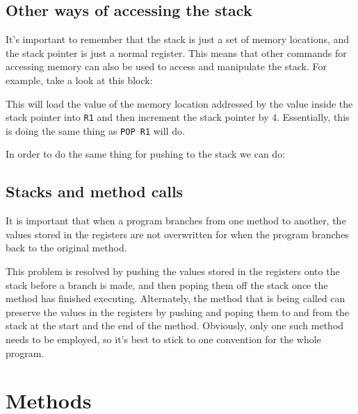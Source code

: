 \subsection{Other ways of accessing the stack}

It's important to remember that the stack is just a set of memory locations, and
the stack pointer is just a normal register. This means that other commands for
accessing memory can also be used to access and manipulate the stack. For
example, take a look at this block:



This will load the value of the memory location addressed by the value inside
the stack pointer into {\tt R1} and then increment the stack pointer by 4.
Essentially, this is doing the same thing as {\tt POP R1} will do.

In order to do the same thing for pushing to the stack we can do:



\subsection{Stacks and method calls}

It is important that when a program branches from one method to another, the
values stored in the registers are not overwritten for when the program branches
back to the original method.

This problem is resolved by pushing the values stored in the registers onto the
stack before a branch is made, and then poping them off the stack once the
method has finished executing. Alternately, the method that is being called can
preserve the values in the registers by pushing and poping them to and from the
stack at the start and the end of the method. Obviously, only one such method
needs to be employed, so it's best to stick to one convention for the whole
program.

\section{Methods}

